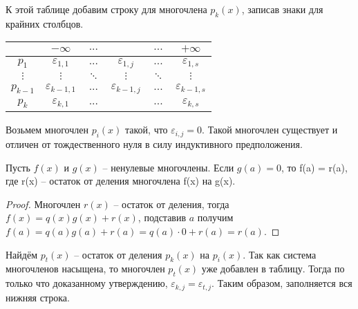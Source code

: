 К этой таблице добавим строку для многочлена $p_{k}(x)$, записав знаки для крайних столбцов.
\begin{center}
    \begin{tabular}{ |c|c|c|c|c|c| } 
    \hline
                 & $-\infty$ & $...$ &  & $...$ & $+\infty$ \\ 
    \hline
        $p_1$ & $\varepsilon_{1, 1}$ & $...$ & $\varepsilon_{1, j}$ & $...$ & $\varepsilon_{1, s}$\\ 
    \hline
        $\vdots$ & $\vdots$ & $\ddots$ & $\vdots$ & $\ddots$ & $\vdots$ \\
    \hline
        $p_{k-1}$ & $\varepsilon_{k-1, 1}$ & $...$ & $\varepsilon_{k-1, j}$ & $...$ & $\varepsilon_{k-1, s}$\\    
    \hline
        $p_{k}$ & $\varepsilon_{k, 1}$ & $...$ & $  $ & $...$ & $\varepsilon_{k, s}$\\    
    \hline
    \end{tabular}
\end{center}
Возьмем многочлен $p_i(x)$ такой, что $\varepsilon_{i, j} = 0$. Такой многочлен существует и отличен от тождественного нуля в силу индуктивного предположения.
\begin{proposal}
    Пусть $f(x)$ и $g(x)$ -- ненулевые многочлены. Если $g(a) = 0$, то f(a) = r(a), где r(x) -- остаток от деления многочлена f(x) на g(x).
\end{proposal}
\begin{proof}
    Многочлен $r(x)$ -- остаток от деления, тогда $f(x) = q(x)g(x) + r(x)$, подставив $a$ получим $f(a) = q(a)g(a) + r(a) = q(a)\cdot 0 + r(a) = r(a)$.
\end{proof}

Найдём $p_t(x)$ -- остаток от деления $p_k(x)$ на $p_i(x)$. Так как система многочленов насыщена, то многочлен $p_t(x)$ уже добавлен в таблицу. Тогда по только что доказанному утверждению, $\varepsilon_{k, j} = \varepsilon_{t, j}$. Таким образом, заполняется вся нижняя строка.

